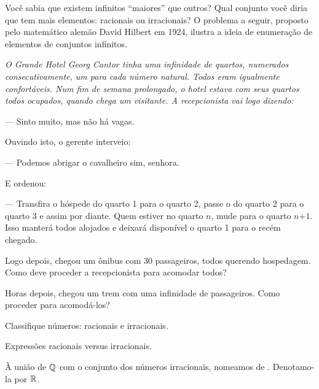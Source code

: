 {
\noindent Você sabia que existem infinitos ``maiores'' que outros? Qual conjunto você diria que tem mais elementos: racionais ou irracionais? O problema a seguir, proposto pelo matemático alemão David Hilbert em 1924, ilustra a ideia de enumeração de elementos de conjuntos infinitos.

{\itshape O Grande Hotel Georg Cantor tinha uma infinidade de quartos, numerados consecutivamente, um para cada número natural. Todos eram igualmente confortáveis. Num fim de semana prolongado, o hotel estava com seus quartos todos ocupados, quando chega um visitante. A recepcionista vai logo dizendo: 

--- Sinto muito, mas não há vagas. 

Ouvindo isto, o gerente interveio: 

--- Podemos abrigar o cavalheiro sim, senhora. 

E ordenou:

--- Transfira o hóspede do quarto 1 para o quarto 2, passe o do quarto 2 para o quarto 3 e assim por diante. Quem estiver no quarto $n$, mude para o quarto $\textit{n+1}$. Isso manterá todos alojados e deixará disponível o quarto 1 para o recém chegado.

Logo depois, chegou um ônibus com 30 passageiros, todos querendo hospedagem. Como deve proceder a recepcionista para acomodar todos? 

Horas depois, chegou um trem com uma infinidade de passageiros. Como proceder para acomodá-los?}
}



\begin{onlineact}
	{Classifique números: racionais e irracionais}.
\end{onlineact}

\begin{onlineact}
	{Expressões racionais versus irracionais}.
\end{onlineact}

\begin{definition}
À união de $\mathbb{Q}$ com o conjunto dos números irracionais, nomeamos de . Denotamo-la por $\mathbb{R}$.
\end{definition}

